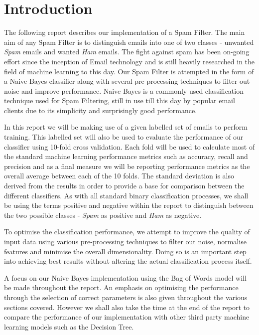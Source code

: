 \section{Introduction}
The following report describes our implementation of a Spam Filter. The main aim of any Spam Filter is to distinguish emails into one of two classes - unwanted \emph{Spam} emails and wanted \emph{Ham} emails. The fight against spam has been on-going effort since the inception of Email technology and is still heavily researched in the field of machine learning to this day. Our Spam Filter is attempted in the form of a Naive Bayes classifier along with several pre-processing techniques to filter out noise and improve performance. Naive Bayes is a commonly used classification technique used for Spam Filtering, still in use till this day by popular email clients due to its simplicity and surprisingly good performance.

In this report we will be making use of a given labelled set of emails to perform training. 
This labelled set will also be used to evaluate the performance of our classifier using 10-fold cross validation. 
Each fold will be used to calculate most of the standard machine learning performance metrics such as accuracy, recall and precision and as a final measure we will be reporting performance metrics as the overall average between each of the 10 folds. 
The standard deviation is also derived from the results in order to provide a base for comparison between the different classifiers.
As with all standard binary classification processes, we shall be using the terms positive and negative within the report to distinguish between the two possible classes - \emph{Spam} as positive and \emph{Ham} as negative.

To optimise the classification performance, we attempt to improve the quality of input data using various pre-processing techniques to filter out noise, normalise features and minimise the overall dimensionality. Doing so is an important step into achieving best results without altering the actual classification process itself.

A focus on our Naive Bayes implementation using the Bag of Words model will be made throughout the report.
An emphasis on optimising the performance through the selection of correct parameters is also given throughout the various sections covered.
However we shall also take the time at the end of the report to compare the performance of our implementation with other third party machine learning models such as the Decision Tree.


